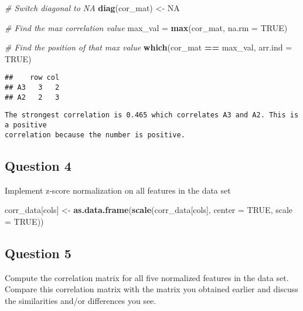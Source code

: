\documentclass[
]{article}
\newenvironment{Shaded}{\begin{snugshade}}{\end{snugshade}}
\newcommand{\AttributeTok}[1]{\textcolor[rgb]{0.13,0.29,0.53}{#1}}
\newcommand{\CommentTok}[1]{\textcolor[rgb]{0.56,0.35,0.01}{\textit{#1}}}
\newcommand{\ConstantTok}[1]{\textcolor[rgb]{0.56,0.35,0.01}{#1}}
\newcommand{\FunctionTok}[1]{\textcolor[rgb]{0.13,0.29,0.53}{\textbf{#1}}}
\newcommand{\NormalTok}[1]{#1}
\newcommand{\OtherTok}[1]{\textcolor[rgb]{0.56,0.35,0.01}{#1}}
\newcommand{\SpecialCharTok}[1]{\textcolor[rgb]{0.81,0.36,0.00}{\textbf{#1}}}
\begin{document}
\begin{Shaded}
\begin{Highlighting}[]
\CommentTok{\# Switch diagonal to NA}
\FunctionTok{diag}\NormalTok{(cor\_mat) }\OtherTok{\textless{}{-}} \ConstantTok{NA}

\CommentTok{\# Find the max correlation value}
\NormalTok{max\_val }\OtherTok{=} \FunctionTok{max}\NormalTok{(cor\_mat, }\AttributeTok{na.rm =} \ConstantTok{TRUE}\NormalTok{)}

\CommentTok{\# Find the position of that max value}
\FunctionTok{which}\NormalTok{(cor\_mat }\SpecialCharTok{==}\NormalTok{ max\_val, }\AttributeTok{arr.ind =} \ConstantTok{TRUE}\NormalTok{)}
\end{Highlighting}
\end{Shaded}

\begin{verbatim}
##    row col
## A3   3   2
## A2   2   3
\end{verbatim}

\begin{verbatim}
The strongest correlation is 0.465 which correlates A3 and A2. This is a positive 
correlation because the number is positive.
\end{verbatim}

\subsection{Question 4}\label{question-4-1}

Implement z-score normalization on all features in the data set

\begin{Shaded}
\begin{Highlighting}[]
\NormalTok{corr\_data[cols] }\OtherTok{\textless{}{-}} \FunctionTok{as.data.frame}\NormalTok{(}\FunctionTok{scale}\NormalTok{(corr\_data[cols], }\AttributeTok{center =} \ConstantTok{TRUE}\NormalTok{, }\AttributeTok{scale =} \ConstantTok{TRUE}\NormalTok{))}
\end{Highlighting}
\end{Shaded}

\subsection{Question 5}\label{question-5-1}

Compute the correlation matrix for all five normalized features in the
data set. Compare this correlation matrix with the matrix you obtained
earlier and discuss the similarities and/or differences you see.
\end{document}
